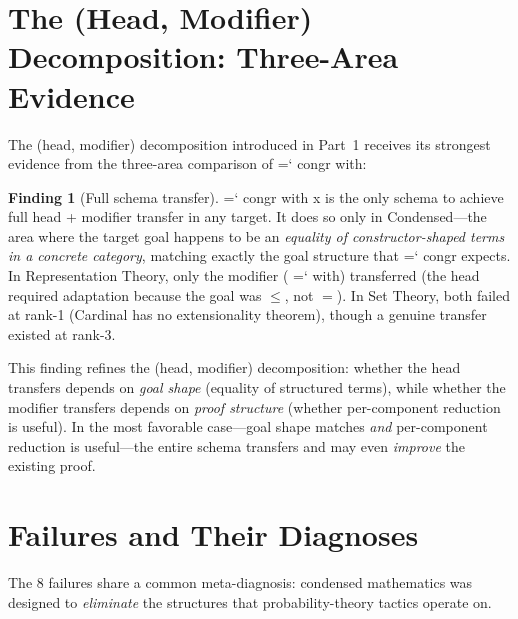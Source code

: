 \documentclass[11pt]{article}
\renewcommand{\texttt}[1]{%
  \begingroup\ttfamily\hyphenchar\font=`\-\relax
  \def\_{\textunderscore\discretionary{}{}{}}%
  #1\endgroup}
\theoremstyle{definition}
\newtheorem{finding}[theorem]{Finding}
\theoremstyle{remark}
\begin{document}
\section{The (Head, Modifier) Decomposition: Three-Area Evidence}%
\label{sec:finding}

The (head, modifier) decomposition introduced in Part~1 receives
its strongest evidence from the three-area comparison of
\texttt{congr with}:

\begin{finding}[Full schema transfer]\label{find:full_transfer}
\texttt{congr with x} is the only schema to achieve full head +
modifier transfer in any target.  It does so only in
Condensed---the area where the target goal happens to be an
\emph{equality of constructor-shaped terms in a concrete category},
matching exactly the goal structure that \texttt{congr} expects.
In Representation Theory, only the modifier (\texttt{with})
transferred (the head required adaptation because the goal was
$\leq$, not $=$).  In Set Theory, both failed at rank-1
(Cardinal has no extensionality theorem), though a genuine transfer
existed at rank-3.
\end{finding}

This finding refines the (head, modifier) decomposition: whether
the head transfers depends on \emph{goal shape} (equality of
structured terms), while whether the modifier transfers depends on
\emph{proof structure} (whether per-component reduction is useful).
In the most favorable case---goal shape matches \emph{and}
per-component reduction is useful---the entire schema transfers
and may even \emph{improve} the existing proof.

\section{Failures and Their Diagnoses}\label{sec:failures}

The 8 failures share a common meta-diagnosis: condensed
mathematics was designed to \emph{eliminate} the structures that
probability-theory tactics operate on.
\end{document}
